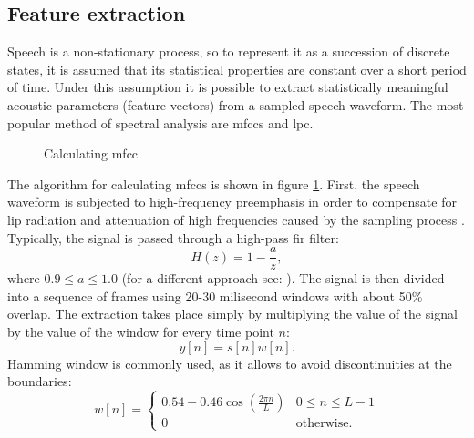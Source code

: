 \subsection{Feature extraction}
\label{subsection:features}
Speech is a non-stationary process, so to represent it as a succession of discrete states, it is assumed that its statistical properties are constant over a short period of time. Under this assumption it is possible to extract statistically meaningful acoustic parameters (feature vectors) from a sampled speech waveform. The most popular method of spectral analysis are \glspl{mfcc} and \gls{lpc}.
\begin{figure}[!ht]
  \centering
    \caption{Calculating \gls{mfcc}}
    \label{figure:mfcc}
\end{figure}

The algorithm for calculating \glspl{mfcc} is shown in figure \ref{figure:mfcc}. First, the speech waveform is subjected to high-frequency preemphasis in order to compensate for lip radiation and attenuation of high frequencies caused by the sampling process \cite{singh2012preprocessing}. Typically, the signal is passed through a high-pass \gls{fir} filter:
\begin{equation}
H(z)=1-\frac{a}{z},
\end{equation}
where $0.9 \leq a \leq 1.0$ (for a different approach see: \cite{nossair1995signal}). The signal is then divided into a sequence of frames using 20-30 milisecond windows with about 50\% overlap. The extraction takes place simply by multiplying the value of the signal by the value of the window for every time point $n$:
\begin{equation}
  y[n]=s[n]w[n].
\end{equation}
Hamming window is commonly used, as it allows to avoid discontinuities at the boundaries:
\begin{equation}
\label{equation:hamming}
  w[n]=
  \begin{cases}
    0.54-0.46\cos(\frac{2 \pi n}{L}) & 0 \leq n \leq L-1 \\
    0                               & \text{otherwise.}
  \end{cases}
\end{equation}


